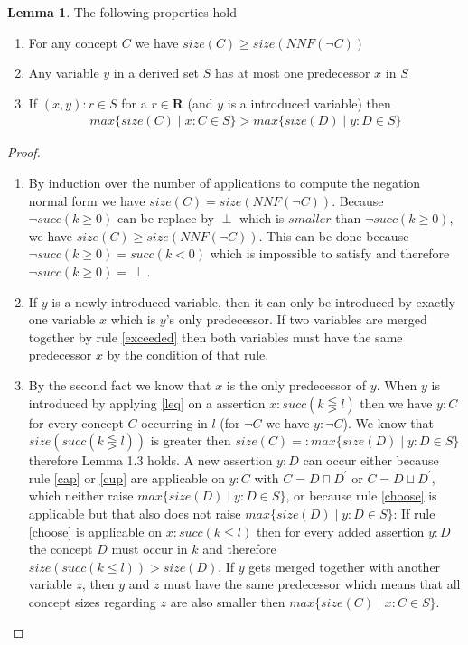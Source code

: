 \documentclass[a4paper,11pt]{scrartcl}
\theoremstyle{break}
\theoremstyle{definition}
\newtheorem{mylem}{Lemma}
\begin{document}
\begin{mylem}
The following properties hold
\begin{enumerate}
\item For any concept $C$ we have $size(C)\geq size(NNF(\neg C))$
 \item Any variable $y$ in a derived set $S$ has at most one predecessor $x$ in $S$
\item If $(x,y):r\in S$ for a $r\in\mathbf{R}$ (and $y$ is a introduced variable) then 
\begin{align*}
max\{size(C)\mid x:C\in S\}>max\{size(D)\mid y:D \in S\}
\end{align*}
\end{enumerate}
\end{mylem}
\begin{proof}$ $\\
\vspace*{-5mm}
\begin{enumerate}
\item By induction over the number of applications to compute the negation normal form we have $size(C)=size(NNF(\neg C))$. Because $\neg succ(k\geq0)$ can be replace by $\perp$ which is $smaller$ than $\neg succ(k\geq 0)$, we have $size(C)\geq size(NNF(\neg C))$. This can be done because $\neg succ(k\geq 0)= succ(k<0)$ which is impossible to satisfy and therefore $\neg succ(k\geq 0)=\perp$.
\item If $y$ is a newly introduced variable, then it can only be introduced by exactly one variable $x$ which is $y$'s only predecessor. If two variables are merged together by rule \ref{exceeded} then both variables must have the same predecessor $x$ by the condition of that rule.
\item By the second fact we know that $x$ is the only predecessor of $y$. When $y$ is introduced by applying \ref{leq} on a assertion $x:succ(k\lesseqgtr l)$ then we have $y:C$ for every concept $C$ occurring in $l$ (for $\neg C$ we have $y:\neg C$). We know that $size(succ(k\lesseqgtr l))$ is greater then $size(C)=:max\{size(D)\mid y:D\in S\}$ therefore Lemma 1.3 holds. A new assertion $y:D$ can occur either because rule \ref{cap} or \ref{cup} are applicable on $y:C$ with $C=D\sqcap D^\prime$ or $C=D\sqcup D^\prime$, which neither raise $max\{size(D)\mid y:D \in S\}$, or because rule \ref{choose} is applicable but that also does not raise $max\{size(D)\mid y:D \in S\}$: If rule \ref{choose} is applicable on $x:succ(k\leq l)$ then for every added assertion $y:D$ the concept $D$ must occur in $k$ and therefore $size(succ(k\leq l))>size(D)$. If $y$ gets merged together with another variable $z$, then $y$ and $z$ must have the same predecessor which means that all concept sizes regarding $z$ are also smaller then $max\{size(C)\mid x:C\in S\}$. 
\end{enumerate}
\end{proof}
\end{document}
